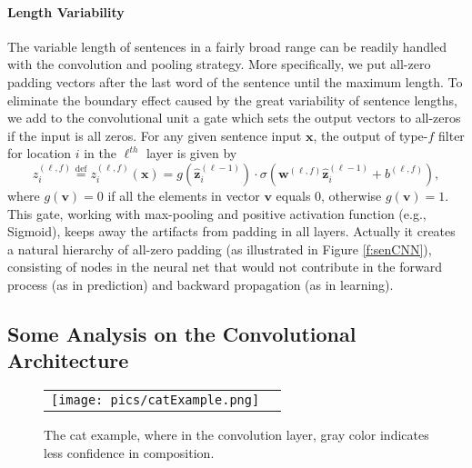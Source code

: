 \documentclass{article} \usepackage{nips14submit_e,times}
\newcommand{\w}{\ensuremath{\mathbf{w}}}
\newcommand{\0}{\ensuremath{\mathbf{0}}}
\newcommand{\1}{\ensuremath{\mathbf{1}}}
\begin{document}
\paragraph{Length Variability} The variable length of sentences in a fairly broad range can be readily handled with the convolution and pooling strategy. More specifically, we put all-zero padding vectors after the last word of the sentence until the maximum length. To eliminate the boundary effect caused by the great variability of sentence lengths, we add to the convolutional unit a gate which sets the output vectors to all-zeros if the input is all zeros. For any given sentence input $\mathbf{x}$, the output of type-$f$ filter for location $i$ in the  $\ell^{th}$ layer is given by
\begin{equation}
z^{(\ell, f)}_{i} \overset{\text{def}}{=}
z^{(\ell,f)}_{i}(\mathbf{x}) =  g(\hat{\mathbf{z}}^{(\ell-1)}_{i})\cdot \sigma(\w^{(\ell,f)} \hat{\mathbf{z}}^{(\ell-1)}_{i} + b^{(\ell,f)}),
\end{equation}
where $g(\mathbf{v}) = 0$ if all the elements in vector $\mathbf{v}$ equals 0, otherwise $g(\mathbf{v}) = 1$. This gate, working with max-pooling and positive activation function (e.g., Sigmoid), keeps away the artifacts from padding in all layers. Actually it creates a natural hierarchy of all-zero padding (as illustrated in Figure \ref{f:senCNN}), consisting of nodes in the neural net that would not contribute in the forward process (as in prediction) and backward propagation (as in learning).


\subsection{Some Analysis on the Convolutional Architecture} \label{s:someAnalysis} \vspace{-10pt}
\begin{wrapfigure}{r}{0.6\textwidth}
\begin{center}
\vspace{-5pt}
    \begin{tabular}[c]{cc}
     \texttt{[image: pics/catExample.png]}
     \end{tabular}
\vspace{-10pt}
    \caption{The cat example, where in the convolution layer, gray color indicates less confidence in composition.} \vspace{-5pt}
    \label{f:cat}
  \end{center}
\end{wrapfigure}
\end{document}
